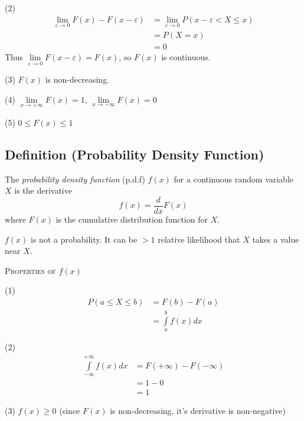 (2) \begin{align*}
    \lim\limits_{{\varepsilon} \to {0}} F(x)-F(x-\varepsilon) & =
    \lim\limits_{{\varepsilon} \to {0}} P(x-\varepsilon<X\le x)         \\
                                                              & =P(X=x) \\
                                                              & =0
\end{align*}
Thus $ \lim\limits_{{\varepsilon} \to {0}} F(x-\varepsilon)=F(x) $, so
$ F(x) $ is continuous.

(3) $ F(x) $ is non-decreasing.

(4) $ \lim\limits_{{x} \to {+\infty}} F(x)=1 $,
$ \lim\limits_{{x} \to {-\infty}} F(x)=0 $

(5) $ 0\le F(x)\le 1 $

\begin{defbox}
    \subsection{Definition (Probability Density Function)}
    The \emph{probability density function} (p.d.f) $ f(x) $ for a continuous
    random variable $ X $ is the derivative
    \[ f(x)=\frac{d}{dx}F(x) \]
    where $ F(x) $ is the cumulative distribution function for $ X $.
\end{defbox}

\begin{remark}
    $ f(x) $ is not a probability. It can be $ >1 $ relative
    likelihood that $ X $ takes a value near $ X $.
\end{remark}

\textsc{Properties of $ f(x) $}

(1)
\begin{align*}
    P(a\le X\le b) & =F(b)-F(a)                     \\
                   & =\int\limits_{a}^{b} f(x) d{x}
\end{align*}

(2)
\begin{align*}
    \int\limits_{-\infty}^{+\infty} f(x) d{x} & =F(+\infty)-F(-\infty) \\
                                              & =1-0                   \\
                                              & =1
\end{align*}

(3) $ f(x)\ge 0 $ (since $ F(x) $ is non-decreasing, it's derivative is non-negative)

